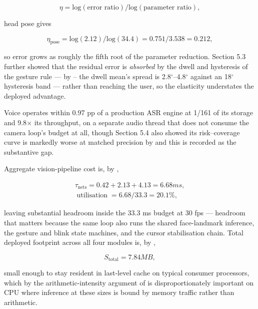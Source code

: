 \begin{equation}
\label{eq:295}
\eta = \mathrm{log}( \text{error ratio} ) / \mathrm{log}( \text{parameter ratio} ) ,
\end{equation}

head pose gives

\begin{equation}
\label{eq:296}
\eta _{\mathrm{pose}} = \mathrm{log}(2.12) / \mathrm{log}(34.4) = 0.751 / 3.538 = 0.212 ,
\end{equation}

so error grows as roughly the fifth root of the parameter reduction. Section 5.3 further showed that the residual error is \emph{absorbed} by the dwell and hysteresis of the gesture rule --- by -- the dwell mean's spread is 2.8$^{\circ}$--4.8$^{\circ}$ against an 18$^{\circ}$ hysteresis band --- rather than reaching the user, so the elasticity understates the deployed advantage.

Voice operates within 0.97 pp of a production ASR engine at 1/161 of its storage and 9.8$\times$ its throughput, on a separate audio thread that does not consume the camera loop's budget at all, though Section 5.4 also showed its risk--coverage curve is markedly worse at matched precision by  and this is recorded as the substantive gap.

Aggregate vision-pipeline cost is, by ,

\begin{equation}
\label{eq:297}
\begin{aligned}
\tau _{\mathrm{nets}} = 0.42 + 2.13 + 4.13 = 6.68 ms , \\
\;\text{utilisation}\; = 6.68 / 33.3 = 20.1 \% ,
\end{aligned}
\end{equation}

leaving substantial headroom inside the 33.3 ms budget at 30 fps --- headroom that matters because the same loop also runs the shared face-landmark inference, the gesture and blink state machines, and the cursor stabilisation chain. Total deployed footprint across all four modules is, by ,

\begin{equation}
\label{eq:298}
S_{\mathrm{total}} = 7.84 MB ,
\end{equation}

small enough to stay resident in last-level cache on typical consumer processors, which by the arithmetic-intensity argument of  is disproportionately important on CPU where inference at these sizes is bound by memory traffic rather than arithmetic.

